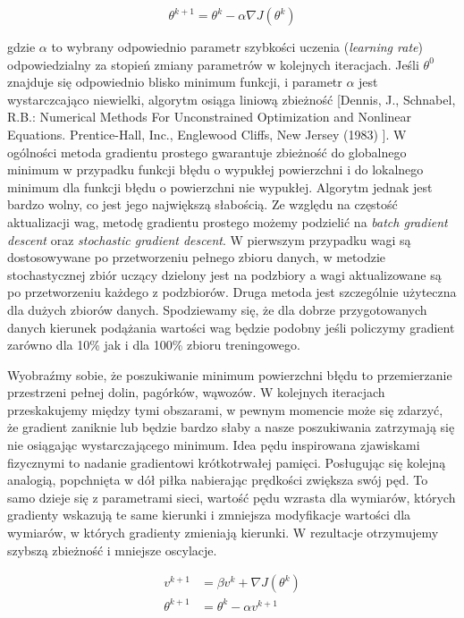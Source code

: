 \documentclass[11pt]{book}
\theoremstyle{definition}
\begin{document}
\begin{equation}
\theta^{k+1} = \theta^{k} - \alpha \nabla J(\theta^{k})
\end{equation}


gdzie $\alpha$ to wybrany odpowiednio parametr szybkości uczenia (\textit{learning rate}) odpowiedzialny za stopień zmiany parametrów w kolejnych iteracjach. Jeśli $\theta^0$ znajduje się odpowiednio blisko minimum funkcji, i parametr $\alpha$ jest wystarczcająco niewielki, algorytm osiąga liniową zbieżność [Dennis, J., Schnabel, R.B.: Numerical Methods For Unconstrained Optimization and Nonlinear Equations. Prentice-Hall, Inc., Englewood Cliffs, New Jersey (1983)
]. W ogólności metoda gradientu prostego gwarantuje zbieżność do globalnego minimum w przypadku funkcji błędu o wypukłej powierzchni i do lokalnego minimum dla funkcji błędu o powierzchni nie wypukłej. Algorytm jednak jest bardzo wolny, co jest jego największą słabością. Ze względu na częstość aktualizacji wag, metodę gradientu prostego możemy podzielić na \textit{batch gradient descent} oraz \textit{stochastic gradient descent}. W pierwszym przypadku wagi są dostosowywane po przetworzeniu pełnego zbioru danych, w metodzie stochastycznej zbiór uczący dzielony jest na podzbiory a wagi aktualizowane są po przetworzeniu każdego z podzbiorów. Druga metoda jest szczególnie użyteczna dla dużych zbiorów danych. Spodziewamy się, że dla dobrze przygotowanych danych kierunek podążania wartości wag będzie podobny jeśli policzymy gradient zarówno dla 10\% jak i dla 100\% zbioru treningowego.


Wyobraźmy sobie, że poszukiwanie minimum powierzchni błędu to przemierzanie przestrzeni pełnej dolin, pagórków, wąwozów. W kolejnych iteracjach przeskakujemy między tymi obszarami, w pewnym momencie może się zdarzyć, że gradient zaniknie lub będzie bardzo słaby a nasze poszukiwania zatrzymają się nie osiągając wystarczającego minimum. Idea pędu inspirowana zjawiskami fizycznymi to nadanie gradientowi krótkotrwałej pamięci. Posługując się kolejną analogią, popchnięta w dół piłka nabierając prędkości zwiększa swój pęd. To samo dzieje się z parametrami sieci, wartość pędu wzrasta dla wymiarów, których gradienty wskazują te same kierunki i zmniejsza modyfikacje wartości dla wymiarów, w których gradienty zmieniają kierunki. W rezultacje otrzymujemy szybszą zbieżność i mniejsze oscylacje.

\begin{align} 
v^{k+1} &=  \beta v^{k}+ \nabla J(\theta^{k}) \\[0.4em]
\theta^{k+1} &=  \theta^{k }- \alpha v^{k+1}
\end{align}
\end{document}
